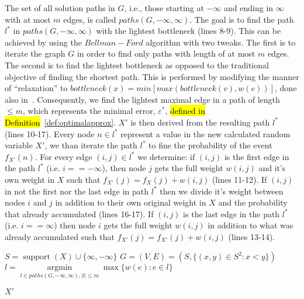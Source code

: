 \documentclass{article}
\DeclareMathOperator{\support}{support}
\DeclareMathOperator{\KlmApprox}{KolmogorovApprox}
\begin{document}
The set of all solution paths in $G$, i.e., those starting at $-\infty$ and ending in $\infty$ with at most $m$ edges, is called $paths(G, -\infty, \infty)$. The goal is to find the path $l^*$ in $paths(G, -\infty, \infty)$ with the lightest bottleneck (lines 8-9). This can be achieved by using the $Bellman-Ford$ algorithm with two tweaks. The first is to iterate the graph $G$ in order to find only paths with length of at most $m$ edges. The second is to find the lightest bottleneck as opposed to the traditional objective of finding the shortest path. This is performed by modifying the manner of ``relaxation'' to $bottleneck(x) = min[max(bottleneck(v),w(e))]$, done also in~\cite{shufan2011two}. Consequently, we find the lightest maximal edge in a path of length $\leq m$, which represents the minimal error, $\varepsilon^*$, \hl{defined in Definition}~\ref{def:optimalapprox}. $X'$ is then derived from the resulting path $l^*$ (lines 10-17). Every node $n \in l^*$ represent a value in the new calculated random variable $X'$, we than iterate the path $l^*$ to fine the probability of the event $f_{X'}(n)$. For every edge $(i,j)\in l^*$ we determine: if $(i,j)$ is the first edge in the path $ l^*$ (i.e.  $i==-\infty$), then node $j$ gets the full weight $w(i,j)$ and it's own weight in $X$ such that $f_{X'}(j) = f_{X}(j) +  w(i,j)$ (lines 11-12). If $(i,j)$ in not the first nor the last edge in path $l^*$ then we divide it's weight between nodes $i$ and $j$ in addition to their own original weight in $X$ and the probability that already accumulated (lines 16-17). If $(i,j)$ is the last edge in the path $ l^*$ (i.e.  $i==\infty$) then node $i$ gets the full weight $w(i,j)$ in addition to what was already accumulated such that $f_{X'}(j) = f_{X'}(j) +  w(i,j)$ (lines 13-14).



\begin{algorithm}\label{alg:optapprox}
	\DontPrintSemicolon
	$S = \support(X)\cup \{\infty,-\infty\}$\;
	$G=(V,E)=(S, \{ (x,y) \in S^2 \colon  x<y \})$  \;
	$ l = \operatorname{argmin}\limits_{l \in paths(G,-\infty,\infty),|l|\leq m}  \max \{ w(e)\colon e \in l  \}$  \;
	
	\Return $X'$\;
	
	\caption{$\KlmApprox (X, m)$}  
	\label{alg:sequence}
\end{algorithm}
\end{document}
